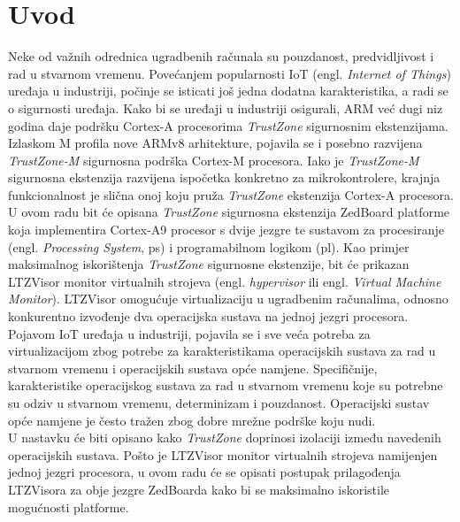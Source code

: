 \documentclass[times, utf8, diplomski, numeric]{fer}
\begin{document}
\chapter{Uvod}
Neke od važnih odrednica ugradbenih računala su pouzdanost, predvidljivost i rad u stvarnom vremenu.
Povećanjem popularnosti IoT (engl. \textit{Internet of Things}) uređaja u industriji, počinje se isticati
još jedna dodatna karakteristika, a radi se o sigurnosti uređaja. Kako bi se uređaji u industriji osigurali,
ARM već dugi niz godina daje podršku Cortex-A procesorima \textit{TrustZone} sigurnosnim ekstenzijama.
Izlaskom M profila nove ARMv8 arhitekture, pojavila se i posebno razvijena \textit{TrustZone-M} sigurnosna
podrška Cortex-M procesora. Iako je \textit{TrustZone-M} sigurnosna ekstenzija razvijena ispočetka konkretno
za mikrokontrolere, krajnja funkcionalnost je slična onoj koju pruža \textit{TrustZone} ekstenzija Cortex-A
procesora.\\
U ovom radu bit će opisana \textit{TrustZone} sigurnosna ekstenzija ZedBoard platforme koja implementira
Cortex-A9 procesor s dvije jezgre te sustavom za procesiranje (engl. \textit{Processing System}, \gls{ps}) i programabilnom
logikom (\gls{pl}). Kao primjer maksimalnog iskorištenja \textit{TrustZone} sigurnosne
ekstenzije, bit će prikazan LTZVisor monitor virtualnih strojeva (engl. \textit{hypervisor} ili engl.
\textit{Virtual Machine Monitor}). LTZVisor omogućuje virtualizaciju u ugradbenim računalima, odnosno konkurentno
izvođenje dva operacijska sustava na jednoj jezgri procesora. Pojavom IoT uređaja u industriji, pojavila
se i sve veća potreba za virtualizacijom zbog potrebe za karakteristikama operacijskih sustava za rad u stvarnom
vremenu i operacijskih sustava opće namjene. Specifičnije, karakteristike operacijskog sustava za rad u
stvarnom vremenu koje su potrebne su odziv u stvarnom vremenu, determinizam i pouzdanost. Operacijski
sustav opće namjene je često tražen zbog dobre mrežne podrške koju nudi.\\
U nastavku će biti opisano kako
\textit{TrustZone} doprinosi izolaciji između navedenih operacijskih sustava. Pošto je LTZVisor monitor
virtualnih strojeva namijenjen jednoj jezgri procesora, u ovom radu će se opisati postupak prilagođenja
LTZVisora za obje jezgre ZedBoarda kako bi se maksimalno iskoristile mogućnosti platforme.
\end{document}
